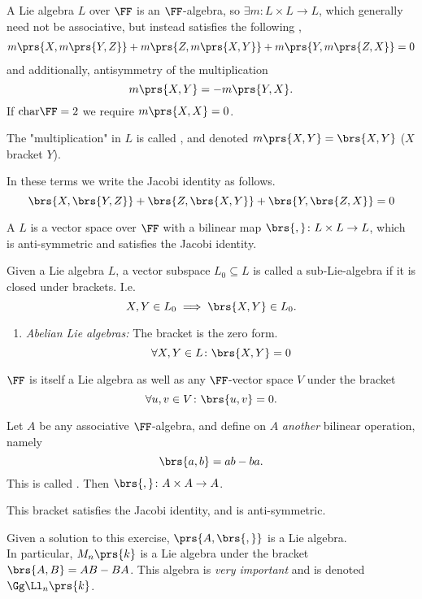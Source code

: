 \documentclass[10pt,a4paper,twoside,openany,hidelinks]{book}
\begin{document}
\begin{definition}
A Lie algebra $L$ over $\FF$ is an $\FF$-algebra, so $\exists m \colon L \times L \to L$, which generally need not be associative, but instead satisfies the following ,
\begin{align*}
m\prs{X, m\prs{Y,Z}} + m\prs{Z, m\prs{X,Y}} + m\prs{Y,m\prs{Z,X}} = 0
\end{align*}
and additionally, antisymmetry of the multiplication
\[m\prs{X,Y} = -m\prs{Y,X} \text{.}\]
If $\mathrm{char}\FF = 2$ we require $m\prs{X,X} = 0$.
\end{definition}
\begin{notation}
The "multiplication" in $L$ is called , and denoted $m\prs{X,Y} = \brs{X,Y}$ ($X$ bracket $Y$).
\end{notation}
\begin{remark}
In these terms we write the Jacobi identity as follows.
\[\brs{X,\brs{Y,Z}} + \brs{Z,\brs{X,Y}} + \brs{Y,\brs{Z,X}} = 0\] 
\end{remark}
\begin{definition}
A  $L$ is a vector space over $\FF$ with a bilinear map $\brs{,} \colon L \times L \to L$, which is anti-symmetric and satisfies the Jacobi identity.
\end{definition}
\begin{definition}
Given a Lie algebra $L$, a vector subspace $L_0 \subseteq L$ is called a sub-Lie-algebra if it is closed under brackets. I.e.
\[X,Y \in L_0 \implies \brs{X,Y} \in L_0 \text{.}\]
\end{definition}
\begin{examples}
\begin{enumerate}
\item \emph{Abelian Lie algebras:} The bracket is the zero form.
\[\forall X,Y \in L\colon \brs{X,Y} = 0\]
\end{enumerate}
\end{examples}
\begin{example}
$\FF$ is itself a Lie algebra as well as any $\FF$-vector space $V$ under the bracket \[\forall u,v \in V\colon \brs{u,v} = 0\text{.}\]
\end{example}
\begin{example}
Let $A$ be any associative $\FF$-algebra, and define on $A$ \emph{another} bilinear operation, namely
\[\brs{a,b} = ab - ba \text{.}\]
This is called .
Then $\brs{,} \colon A \times A \to A$.
\begin{exercise}
This bracket satisfies the Jacobi identity, and is anti-symmetric.
\end{exercise}
Given a solution to this exercise, $\prs{A, \brs{,}}$ is a Lie algebra.
\\
In particular, $M_n\prs{k}$ is a Lie algebra under the bracket $\brs{A,B} = AB - BA$.
This algebra is \emph{very important} and is denoted $\Gg \Ll_n \prs{k}$.
\end{example}
\end{document}
